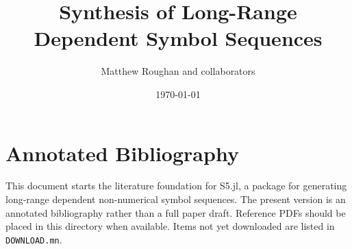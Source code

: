\documentclass[11pt]{article}
\title{Synthesis of Long-Range Dependent Symbol Sequences}
\author{Matthew Roughan and collaborators}
\date{\today}
\begin{document}
\maketitle

\section{Annotated Bibliography}

This document starts the literature foundation for S5.jl, a package for
generating long-range dependent non-numerical symbol sequences. The present
version is an annotated bibliography rather than a full paper draft. Reference
PDFs should be placed in this directory when available. Items not yet downloaded
are listed in \texttt{DOWNLOAD.mn}.


\end{document}
